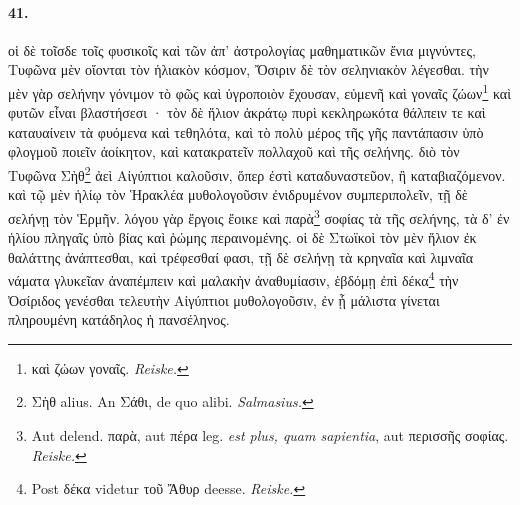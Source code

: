 \documentclass[a4paper, 11pt, oneside, polutonikogreek, german, landscape]{article}
\begin{document}
\paragraph{41.}
οἱ δὲ τοῖσδε τοῖς φυσικοῖς καὶ τῶν ἀπ' ἀστρολογίας μαθηματικῶν ἔνια μιγνύντες, Τυφῶνα μὲν οἴονται τὸν ἡλιακὸν κόσμον, Ὄσιριν δὲ τὸν σεληνιακὸν λέγεσθαι. τὴν μὲν γὰρ σελήνην γόνιμον τὸ φῶς καὶ ὑγροποιὸν ἔχουσαν, εὐμενῆ καὶ γοναῖς ζώων\footnote{καὶ ζώων γοναῖς. \emph{Reiske.}} καὶ φυτῶν εἶναι βλαστήσεσι · τὸν δὲ ἥλιον ἀκράτῳ πυρὶ κεκληρωκότα θάλπειν τε καὶ καταυαίνειν τὰ φυόμενα καὶ τεθηλότα, καὶ τὸ πολὺ μέρος τῆς γῆς παντάπασιν ὑπὸ φλογμοῦ ποιεῖν ἀοίκητον, καὶ κατακρατεῖν πολλαχοῦ καὶ τῆς σελήνης. διὸ τὸν Τυφῶνα Σὴθ\footnote{Σὴθ alius. An Σάθι, de quo alibi. \emph{Salmasius.}} ἀεὶ Αἰγύπτιοι καλοῦσιν, ὅπερ ἐστὶ καταδυναστεῦον, ἢ καταβιαζόμενον. καὶ τῷ μὲν ἡλίῳ τὸν Ἡρακλέα μυθολογοῦσιν ἐνιδρυμένον συμπεριπολεῖν, τῇ δὲ σελήνῃ τὸν Ἑρμῆν. λόγου γὰρ ἔργοις ἔοικε καὶ παρὰ\footnote{Aut delend. παρὰ, aut πέρα leg. \emph{est plus, quam sapientia}, aut περισσῆς σοφίας. \emph{Reiske.}} σοφίας τὰ τῆς σελήνης, τὰ δ' ἐν ἡλίου πληγαῖς ὑπὸ βίας καὶ ῥώμης περαινομένης. οἱ δὲ Στωϊκοὶ τὸν μὲν ἥλιον ἐκ θαλάττης ἀνάπτεσθαι, καὶ τρέφεσθαί φασι, τῇ δὲ σελήνῃ τὰ κρηναῖα καὶ λιμναῖα νάματα γλυκεῖαν ἀναπέμπειν καὶ μαλακὴν ἀναθυμίασιν, ἑβδόμῃ ἐπὶ δέκα\footnote{Post δέκα videtur τοῦ Ἄθυρ deesse. \emph{Reiske.}} τὴν Ὀσίριδος γενέσθαι τελευτὴν Αἰγύπτιοι μυθολογοῦσιν, ἐν ᾗ μάλιστα γίνεται πληρουμένη κατάδηλος ἡ πανσέληνος.
\end{document}
